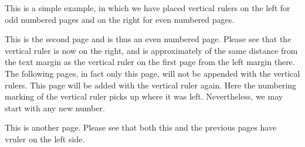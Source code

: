 \documentclass[twoside]{article}
\begin{document}
\advance\textwidth 3cm %
\setvruler [][][][][][\textwidth]
         This is a simple example, in which we have
         placed vertical rulers on the left for
         odd numbered pages and on the right for
         even numbered pages. \newpage

         This is the second page and is thus an even
         numbered page. Please see that the vertical
         ruler is now on the right, and is approximately
         of the same distance from the text margin as
         the vertical ruler on the first page from
         the left margin there. \newpage
\unsetvruler
         The following pages, in fact only this page, will
         not be appended with the vertical rulers.\newpage
\setvruler[][\rulercount]
         This page will be added with the vertical ruler again.
         Here the numbering marking of the vertical ruler picks
         up where it was left. Nevertheless, we may start with
         any new number. \newpage

         This is another page. Please see that both this and
         the previous pages have vruler on the left side.
\end{document}
